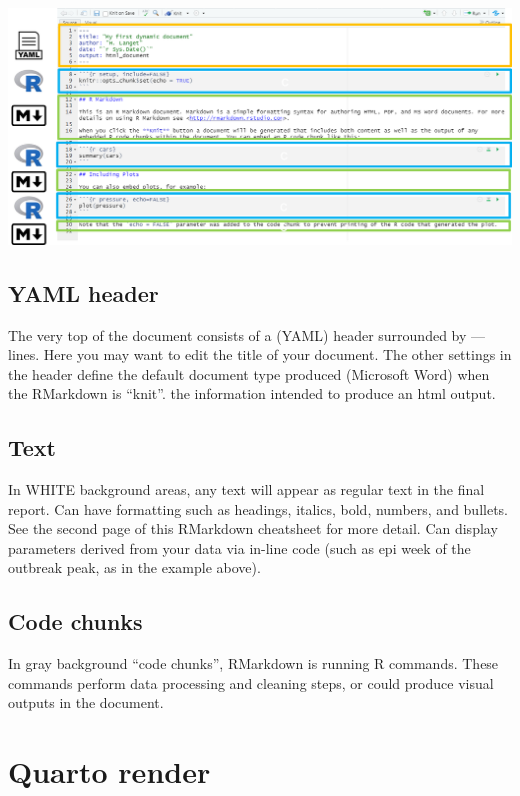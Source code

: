 \documentclass[
  letterpaper,
  DIV=11,
  numbers=noendperiod,
  oneside]{scrreprt}
\begin{document}
\includegraphics{images/paste-30C30ECC.png}

\subsection{YAML header}

The very top of the document consists of a (YAML) header surrounded by
--- lines. Here you may want to edit the title of your document. The
other settings in the header define the default document type produced
(Microsoft Word) when the RMarkdown is ``knit''. the information
intended to produce an html output.

\subsection{Text}

In WHITE background areas, any text will appear as regular text in the
final report. Can have formatting such as headings, italics, bold,
numbers, and bullets. See the second page of this RMarkdown cheatsheet
for more detail. Can display parameters derived from your data via
in-line code (such as epi week of the outbreak peak, as in the example
above).

\subsection{Code chunks}

In gray background ``code chunks'', RMarkdown is running R commands.
These commands perform data processing and cleaning steps, or could
produce visual outputs in the document.

\hypertarget{quarto-render}{%
\section{Quarto render}\label{quarto-render}}
\end{document}
